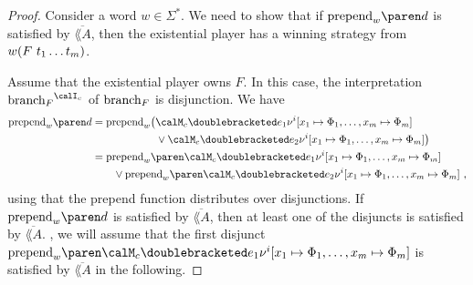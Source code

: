 \documentclass[../../diss.tex]{subfiles}
\begin{document}
\begin{proof}
        Consider a word $w \in \Sigma^*$.
        We need to show that if
        \(
            \prepend{w}{d}
        \)
        is satisfied by $\overline{\lang{A}}$, then the existential player has a winning strategy from $w ( F \  t_1 \ldots t_m)$.

        Assume that the existential player owns $F$.
        In this case, the interpretation ${\brancht_F}^{\interpretationc}$ of $\text{branch}_F$ is disjunction.
        We have
        \begin{align*}
            \prepend{w}{d}
            &= \textprepend_{w}
            \big(
            \semc{e_1}{\val^{i} [x_1 \mapsto \judgment_1, \ldots, x_m \mapsto \judgment_m]}
            \\
            & \qquad\qquad\qquad
            \vee
            \semc{e_2}{\val^{i} [x_1 \mapsto \judgment_1, \ldots, x_m \mapsto \judgment_m]}
            \big)
            \\
            &=
            \prepend{w}{
            \semc{e_1}{\val^{i} [x_1 \mapsto \judgment_1, \ldots, x_m \mapsto \judgment_m]}}
            \\
            & \qquad
            \vee
            \prepend{w}{
            \semc{e_2}{\val^{i} [x_1 \mapsto \judgment_1, \ldots, x_m \mapsto \judgment_m]}}
            \ ,
        \end{align*}
        using that the prepend function distributes over disjunctions.
        If $\prepend{w}{d}$ is satisfied by $\overline{\lang{A}}$, then at least one of the disjuncts is satisfied by $\overline{\lang{A}}$.
        \Wolog, we will assume that the first disjunct $\prepend{w}{
            \semc{e_1}{\val^{i} [x_1 \mapsto \judgment_1, \ldots, x_m \mapsto \judgment_m]}}$ is satisfied by $\overline{\lang{A}}$ in the following.


\end{proof}
\end{document}
